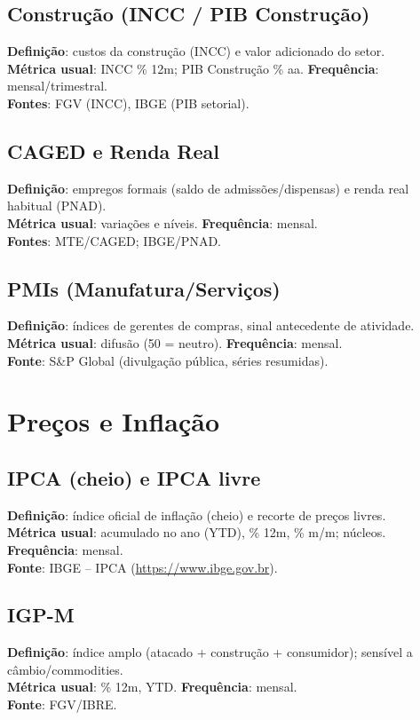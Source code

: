 \documentclass[11pt,a4paper]{article}
\begin{document}
\subsection*{Construção (INCC / PIB Construção)}
\textbf{Definição}: custos da construção (INCC) e valor adicionado do setor.\\
\textbf{Métrica usual}: INCC \% 12m; PIB Construção \% aa. \textbf{Frequência}: mensal/trimestral.\\
\textbf{Fontes}: FGV (INCC), IBGE (PIB setorial).

\subsection*{CAGED e Renda Real}
\textbf{Definição}: empregos formais (saldo de admissões/dispensas) e renda real habitual (PNAD).\\
\textbf{Métrica usual}: variações e níveis. \textbf{Frequência}: mensal.\\
\textbf{Fontes}: MTE/CAGED; IBGE/PNAD.

\subsection*{PMIs (Manufatura/Serviços)}
\textbf{Definição}: índices de gerentes de compras, sinal antecedente de atividade.\\
\textbf{Métrica usual}: difusão (50 = neutro). \textbf{Frequência}: mensal.\\
\textbf{Fonte}: S\&P Global (divulgação pública, séries resumidas).

\section{Preços e Inflação}
\subsection*{IPCA (cheio) e IPCA livre}
\textbf{Definição}: índice oficial de inflação (cheio) e recorte de preços livres.\\
\textbf{Métrica usual}: acumulado no ano (YTD), \% 12m, \% m/m; núcleos. \textbf{Frequência}: mensal.\\
\textbf{Fonte}: IBGE -- IPCA (\url{https://www.ibge.gov.br}).

\subsection*{IGP-M}
\textbf{Definição}: índice amplo (atacado + construção + consumidor); sensível a câmbio/commodities.\\
\textbf{Métrica usual}: \% 12m, YTD. \textbf{Frequência}: mensal.\\
\textbf{Fonte}: FGV/IBRE.
\end{document}
